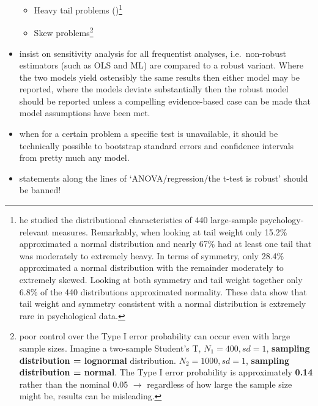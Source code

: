 \documentclass[
]{article}
\providecommand{\tightlist}{%
  \setlength{\itemsep}{0pt}\setlength{\parskip}{0pt}}
\begin{document}
\begin{itemize}
  \begin{itemize}
  \tightlist
  \item
    Heavy tail problems ()\footnote{ he studied the distributional characteristics of 440 large-sample psychology-relevant measures. Remarkably, when looking at tail weight only 15.2\% approximated a normal distribution and nearly 67\% had at least one tail that was moderately to extremely heavy. In terms of symmetry, only 28.4\% approximated a normal distribution with the remainder moderately to extremely skewed. Looking at both symmetry and tail weight together only 6.8\% of the 440 distributions approximated normality. These data show that tail weight and symmetry consistent with a normal distribution is extremely rare in psychological data.}
  \item
    Skew problems\footnote{ poor control over the Type I error probability can occur even with large sample sizes. Imagine a two-sample Student's T, \(N_1 = 400, sd = 1\), \textbf{sampling distribution = lognormal} distribution. \(N_2= 1000, sd = 1\), \textbf{sampling distribution = normal}. The Type I error probability is approximately \textbf{0.14} rather than the nominal 0.05 \(\rightarrow\) regardless of how large the sample size might be, results can be misleading.}
  \end{itemize}
\item
  insist on sensitivity analysis for all frequentist analyses, i.e.~non-robust estimators (such as OLS and ML) are compared to a robust variant. Where the two models yield ostensibly the same results then either model may be reported, where the models deviate substantially then the robust model should be reported unless a compelling evidence-based case can be made that model assumptions have been met.
\item
  when for a certain problem a specific test is unavailable, it should be technically possible to bootstrap standard errors and confidence intervals from pretty much any model.
\item
  statements along the lines of `ANOVA/regression/the t-test is robust' should be banned!
\end{itemize}
\end{document}
